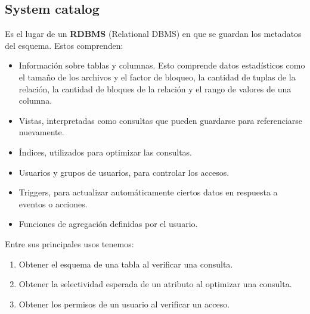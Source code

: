 \subsection*{System catalog}
Es el lugar de un \textbf{RDBMS} (Relational DBMS) en que se guardan los metadatos del esquema. Estos comprenden:
\begin{itemize}
    \item Información sobre tablas y columnas. Esto comprende datos estadísticos como el tamaño de los archivos y el factor de bloqueo, la cantidad de tuplas de la relación, la cantidad de bloques de la relación y el rango de valores de una columna.
    \item Vistas, interpretadas como consultas que pueden guardarse para referenciarse nuevamente.
    \item Índices, utilizados para optimizar las consultas.
    \item Usuarios y grupos de usuarios, para controlar los accesos.
    \item Triggers, para actualizar automáticamente ciertos datos en respuesta a eventos o acciones.
    \item Funciones de agregación definidas por el usuario.
\end{itemize}
Entre sus principales usos tenemos:
\begin{enumerate}[label=\roman*]
    \item Obtener el esquema de una tabla al verificar una consulta.
    \item Obtener la selectividad esperada de un atributo al optimizar una consulta.
    \item Obtener los permisos de un usuario al verificar un acceso.
\end{enumerate}

